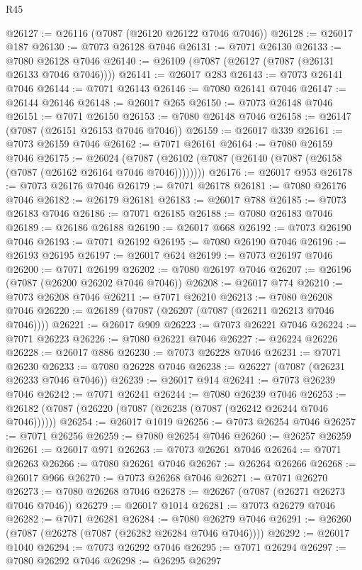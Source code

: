 \begin{lexlean}{R45}
\begin{coremodule}
{@26127 := @26116 (@7087 (@26120 @26122 @7046 @7046))
@26128 := @26017 @187
@26130 := @7073 @26128 @7046
@26131 := @7071 @26130
@26133 := @7080 @26128 @7046
@26140 := @26109 (@7087 (@26127 (@7087 (@26131 @26133 @7046 @7046))))
@26141 := @26017 @283
@26143 := @7073 @26141 @7046
@26144 := @7071 @26143
@26146 := @7080 @26141 @7046
@26147 := @26144 @26146
@26148 := @26017 @265
@26150 := @7073 @26148 @7046
@26151 := @7071 @26150
@26153 := @7080 @26148 @7046
@26158 := @26147 (@7087 (@26151 @26153 @7046 @7046))
@26159 := @26017 @339
@26161 := @7073 @26159 @7046
@26162 := @7071 @26161
@26164 := @7080 @26159 @7046
@26175 := @26024
    (@7087 (@26102 (@7087 (@26140 (@7087 (@26158 (@7087 (@26162 @26164 @7046 @7046))))))))
@26176 := @26017 @953
@26178 := @7073 @26176 @7046
@26179 := @7071 @26178
@26181 := @7080 @26176 @7046
@26182 := @26179 @26181
@26183 := @26017 @788
@26185 := @7073 @26183 @7046
@26186 := @7071 @26185
@26188 := @7080 @26183 @7046
@26189 := @26186 @26188
@26190 := @26017 @668
@26192 := @7073 @26190 @7046
@26193 := @7071 @26192
@26195 := @7080 @26190 @7046
@26196 := @26193 @26195
@26197 := @26017 @624
@26199 := @7073 @26197 @7046
@26200 := @7071 @26199
@26202 := @7080 @26197 @7046
@26207 := @26196 (@7087 (@26200 @26202 @7046 @7046))
@26208 := @26017 @774
@26210 := @7073 @26208 @7046
@26211 := @7071 @26210
@26213 := @7080 @26208 @7046
@26220 := @26189 (@7087 (@26207 (@7087 (@26211 @26213 @7046 @7046))))
@26221 := @26017 @909
@26223 := @7073 @26221 @7046
@26224 := @7071 @26223
@26226 := @7080 @26221 @7046
@26227 := @26224 @26226
@26228 := @26017 @886
@26230 := @7073 @26228 @7046
@26231 := @7071 @26230
@26233 := @7080 @26228 @7046
@26238 := @26227 (@7087 (@26231 @26233 @7046 @7046))
@26239 := @26017 @914
@26241 := @7073 @26239 @7046
@26242 := @7071 @26241
@26244 := @7080 @26239 @7046
@26253 := @26182 (@7087 (@26220 (@7087 (@26238 (@7087 (@26242 @26244 @7046 @7046))))))
@26254 := @26017 @1019
@26256 := @7073 @26254 @7046
@26257 := @7071 @26256
@26259 := @7080 @26254 @7046
@26260 := @26257 @26259
@26261 := @26017 @971
@26263 := @7073 @26261 @7046
@26264 := @7071 @26263
@26266 := @7080 @26261 @7046
@26267 := @26264 @26266
@26268 := @26017 @966
@26270 := @7073 @26268 @7046
@26271 := @7071 @26270
@26273 := @7080 @26268 @7046
@26278 := @26267 (@7087 (@26271 @26273 @7046 @7046))
@26279 := @26017 @1014
@26281 := @7073 @26279 @7046
@26282 := @7071 @26281
@26284 := @7080 @26279 @7046
@26291 := @26260 (@7087 (@26278 (@7087 (@26282 @26284 @7046 @7046))))
@26292 := @26017 @1040
@26294 := @7073 @26292 @7046
@26295 := @7071 @26294
@26297 := @7080 @26292 @7046
@26298 := @26295 @26297
}
\end{coremodule}
\end{lexlean}
